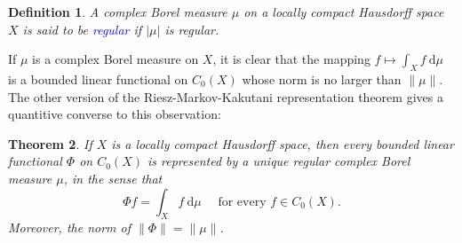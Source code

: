 \documentclass[11pt]{article}
\theoremstyle{thmstyle}
\newtheorem{theorem}{Theorem}[section]
\theoremstyle{defstyle}
\newtheorem{definition}[theorem]{Definition}
\newcommand{\define}[1]{\textcolor{blue}{\textit{#1}}}
\begin{document}
\begin{definition}
    A complex Borel measure $\mu$ on a locally compact Hausdorff space $X$ is said to be \define{regular} if $|\mu|$ is regular. 
\end{definition}

If $\mu$ is a complex Borel measure on $X$, it is clear that the mapping $\displaystyle f\mapsto\int_X f~\mathrm d\mu$ is a bounded linear functional on $C_0(X)$ whose norm is no larger than $\|\mu\|$. The other version of the Riesz-Markov-Kakutani representation theorem gives a quantitive converse to this observation: 

\begin{theorem}
    If $X$ is a locally compact Hausdorff space, then every bounded linear functional $\Phi$ on $C_0(X)$ is represented by a unique regular complex Borel measure $\mu$, in the sense that 
    \begin{equation*}
        \Phi f = \int_X f~\mathrm d\mu\quad\text{ for every }f\in C_0(X).
    \end{equation*}
    Moreover, the norm of $\|\Phi\| = \|\mu\|$.
\end{theorem}
\end{document}
